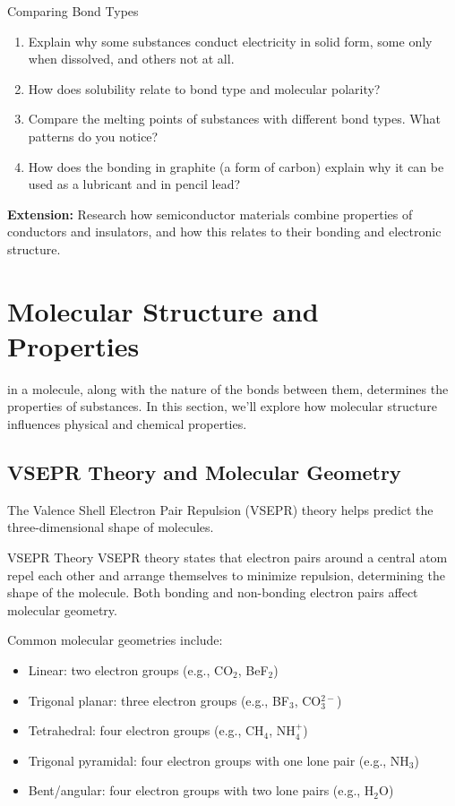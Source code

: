 \begin{investigation}{Comparing Bond Types}
\begin{enumerate}
    \item Explain why some substances conduct electricity in solid form, some only when dissolved, and others not at all.
    
    \item How does solubility relate to bond type and molecular polarity?
    
    \item Compare the melting points of substances with different bond types. What patterns do you notice?
    
    \item How does the bonding in graphite (a form of carbon) explain why it can be used as a lubricant and in pencil lead?
\end{enumerate}

\textbf{Extension:} Research how semiconductor materials combine properties of conductors and insulators, and how this relates to their bonding and electronic structure.
\end{investigation}

\section{Molecular Structure and Properties}

 in a molecule, along with the nature of the bonds between them, determines the properties of substances. In this section, we'll explore how molecular structure influences physical and chemical properties.

\subsection{VSEPR Theory and Molecular Geometry}

The Valence Shell Electron Pair Repulsion (VSEPR) theory helps predict the three-dimensional shape of molecules.

\begin{keyconcept}{VSEPR Theory}
VSEPR theory states that electron pairs around a central atom repel each other and arrange themselves to minimize repulsion, determining the shape of the molecule. Both bonding and non-bonding electron pairs affect molecular geometry.
\end{keyconcept}

Common molecular geometries include:
\begin{itemize}
    \item Linear: two electron groups (e.g., CO$_2$, BeF$_2$)
    \item Trigonal planar: three electron groups (e.g., BF$_3$, CO$_3^{2-}$)
    \item Tetrahedral: four electron groups (e.g., CH$_4$, NH$_4^+$)
    \item Trigonal pyramidal: four electron groups with one lone pair (e.g., NH$_3$)
    \item Bent/angular: four electron groups with two lone pairs (e.g., H$_2$O)
\end{itemize}


